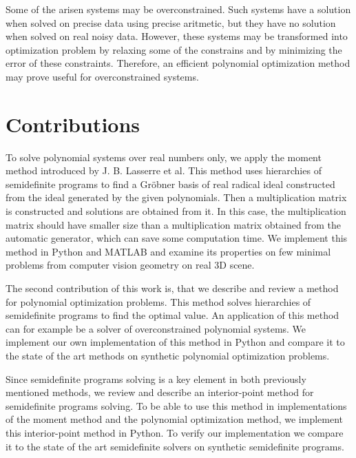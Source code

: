 Some of the arisen systems may be overconstrained.
Such systems have a solution when solved on precise data using precise aritmetic, but they have no solution when solved on real noisy data.
However, these systems may be transformed into optimization problem by relaxing some of the constrains and by minimizing the error of these constraints.
Therefore, an efficient polynomial optimization method may prove useful for overconstrained systems.

\section{Contributions}
To solve polynomial systems over real numbers only, we apply the moment method introduced by J. B. Lasserre et al.
This method uses hierarchies of semidefinite programs to find a Gr\"obner basis of real radical ideal constructed from the ideal generated by the given polynomials.
Then a multiplication matrix is constructed and solutions are obtained from it.
In this case, the multiplication matrix should have smaller size than a multiplication matrix obtained from the automatic generator, which can save some computation time.
We implement this method in Python and MATLAB and examine its properties on few minimal problems from computer vision geometry on real 3D scene.

The second contribution of this work is, that we describe and review a method for polynomial optimization problems.
This method solves hierarchies of semidefinite programs to find the optimal value.
An application of this method can for example be a solver of overconstrained polynomial systems.
We implement our own implementation of this method in Python and compare it to the state of the art methods on synthetic polynomial optimization problems.

Since semidefinite programs solving is a key element in both previously mentioned methods, we review and describe an interior-point method for semidefinite programs solving.
To be able to use this method in implementations of the moment method and the polynomial optimization method, we implement this interior-point method in Python.
To verify our implementation we compare it to the state of the art semidefinite solvers on synthetic semidefinite programs.
